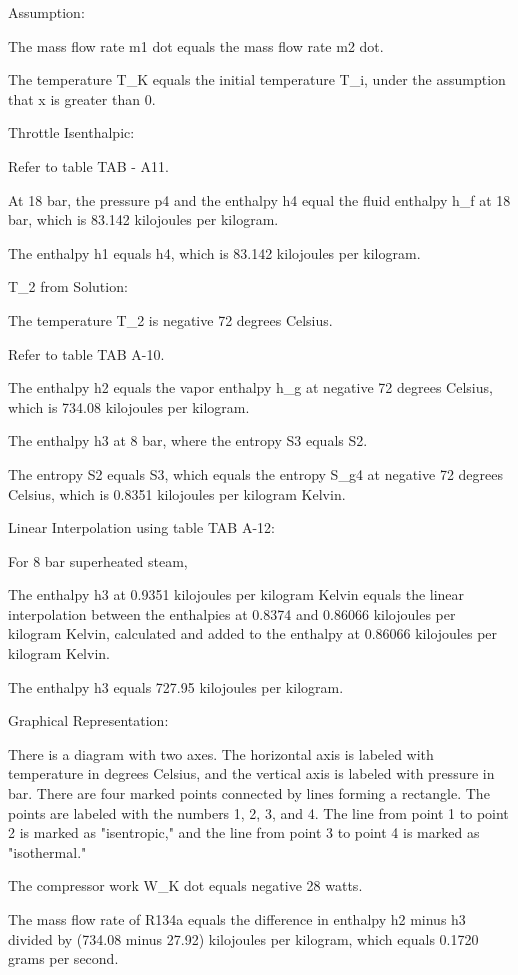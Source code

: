 Assumption:

The mass flow rate m1 dot equals the mass flow rate m2 dot.

The temperature T_K equals the initial temperature T_i, under the assumption that x is greater than 0.

Throttle Isenthalpic:

Refer to table TAB - A11.

At 18 bar, the pressure p4 and the enthalpy h4 equal the fluid enthalpy h_f at 18 bar, which is 83.142 kilojoules per kilogram.

The enthalpy h1 equals h4, which is 83.142 kilojoules per kilogram.

T_2 from Solution:

The temperature T_2 is negative 72 degrees Celsius.

Refer to table TAB A-10.

The enthalpy h2 equals the vapor enthalpy h_g at negative 72 degrees Celsius, which is 734.08 kilojoules per kilogram.

The enthalpy h3 at 8 bar, where the entropy S3 equals S2.

The entropy S2 equals S3, which equals the entropy S_g4 at negative 72 degrees Celsius, which is 0.8351 kilojoules per kilogram Kelvin.

Linear Interpolation using table TAB A-12:

For 8 bar superheated steam,

The enthalpy h3 at 0.9351 kilojoules per kilogram Kelvin equals the linear interpolation between the enthalpies at 0.8374 and 0.86066 kilojoules per kilogram Kelvin, calculated and added to the enthalpy at 0.86066 kilojoules per kilogram Kelvin.

The enthalpy h3 equals 727.95 kilojoules per kilogram.

Graphical Representation:

There is a diagram with two axes. The horizontal axis is labeled with temperature in degrees Celsius, and the vertical axis is labeled with pressure in bar. There are four marked points connected by lines forming a rectangle. The points are labeled with the numbers 1, 2, 3, and 4. The line from point 1 to point 2 is marked as "isentropic," and the line from point 3 to point 4 is marked as "isothermal."

The compressor work W_K dot equals negative 28 watts.

The mass flow rate of R134a equals the difference in enthalpy h2 minus h3 divided by (734.08 minus 27.92) kilojoules per kilogram, which equals 0.1720 grams per second.

